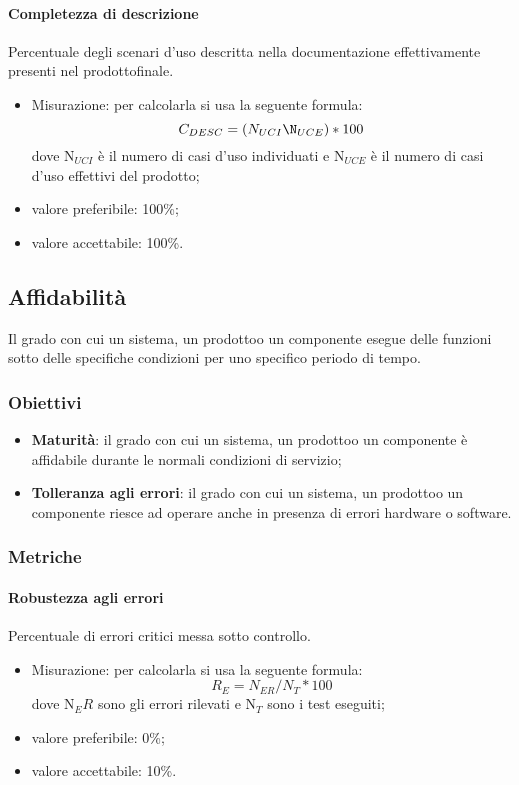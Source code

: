             \paragraph{Completezza di descrizione}
                Percentuale degli scenari d’uso descritta nella documentazione effettivamente presenti nel prodotto\glosp finale.
                \begin{itemize}
                    \item Misurazione: per calcolarla si usa la seguente formula:
                    \[C_{DESC}=(N_{UCI}\N_{UCE})*100\]
                    dove N$_{UCI}$ è il numero di casi d'uso individuati e N$_{UCE}$ è il numero di casi d'uso effettivi del prodotto\glo;
                    \item valore preferibile: 100\%;
                    \item valore accettabile: 100\%.
                \end{itemize}
    \subsection{Affidabilità}
        Il grado con cui un sistema, un prodotto\glosp o un componente esegue delle funzioni sotto delle specifiche condizioni per uno specifico periodo di tempo.
        \subsubsection{Obiettivi}
            \begin{itemize}
                \item \textbf{Maturità}: il grado con cui un sistema, un prodotto\glosp o un componente è affidabile durante le normali condizioni di servizio;
                \item \textbf{Tolleranza agli errori}: il grado con cui un sistema, un prodotto\glosp o un componente riesce ad operare anche in presenza di errori hardware o software.
            \end{itemize}
        \subsubsection{Metriche}
            \paragraph{Robustezza agli errori}
                Percentuale di errori critici messa sotto controllo.
                \begin{itemize}
                    \item Misurazione: per calcolarla si usa la seguente formula:
                    \[R_E=N_{ER}/N_{T}*100\]
                    dove N$_ER$ sono gli errori rilevati e N$_T$ sono i test eseguiti;
                    \item valore preferibile: 0\%;
                    \item valore accettabile: 10\%.
                \end{itemize}
